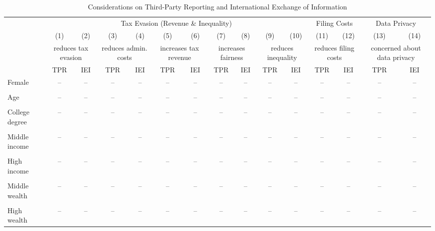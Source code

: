 \documentclass[11pt]{article}
\begin{document}
\FloatBarrier
\begin{landscape}
\begin{table}[!htbp]\centering
\caption{Considerations on Third-Party Reporting and International Exchange of Information}
\label{tab:policyconsiderationstpr_noc}
\begin{threeparttable}
\tiny
\begin{tabular}{l||cc|cc|cc|cc|cc||cc||cc}
\toprule
& \multicolumn{10}{c||}{Tax Evasion (Revenue \& Inequality)} & \multicolumn{2}{c||}{Filing Costs} & \multicolumn{2}{c}{Data Privacy} \\
& (1) & (2) & (3) & (4) & (5) & (6) & (7) & (8) & (9) & (10) & (11) & (12) & (13) & (14) \\[0.5em]
& \multicolumn{2}{c|}{reduces tax evasion} & \multicolumn{2}{c|}{reduces admin. costs} & \multicolumn{2}{c|}{increases tax revenue} & \multicolumn{2}{c|}{increases fairness} & \multicolumn{2}{c||}{reduces inequality} & \multicolumn{2}{c||}{reduces filing costs} & \multicolumn{2}{c}{concerned about data privacy} \\
& TPR & IEI & TPR & IEI & TPR & IEI & TPR & IEI & TPR & IEI & TPR & IEI & TPR & IEI \\
\midrule
Female & -- & -- & -- & -- & -- & -- & -- & -- & -- & -- & -- & -- & -- & -- \\
 &  &  &  &  &  &  &  &  &  &  &  &  &  &  \\
Age & -- & -- & -- & -- & -- & -- & -- & -- & -- & -- & -- & -- & -- & -- \\
 &  &  &  &  &  &  &  &  &  &  &  &  &  &  \\
College degree & -- & -- & -- & -- & -- & -- & -- & -- & -- & -- & -- & -- & -- & -- \\
 &  &  &  &  &  &  &  &  &  &  &  &  &  &  \\
Middle income & -- & -- & -- & -- & -- & -- & -- & -- & -- & -- & -- & -- & -- & -- \\
 &  &  &  &  &  &  &  &  &  &  &  &  &  &  \\
High income & -- & -- & -- & -- & -- & -- & -- & -- & -- & -- & -- & -- & -- & -- \\
 &  &  &  &  &  &  &  &  &  &  &  &  &  &  \\
Middle wealth & -- & -- & -- & -- & -- & -- & -- & -- & -- & -- & -- & -- & -- & -- \\
 &  &  &  &  &  &  &  &  &  &  &  &  &  &  \\
High wealth & -- & -- & -- & -- & -- & -- & -- & -- & -- & -- & -- & -- & -- & -- \\

\end{tabular}
\end{threeparttable}
\end{table}
\end{landscape}
\end{document}
